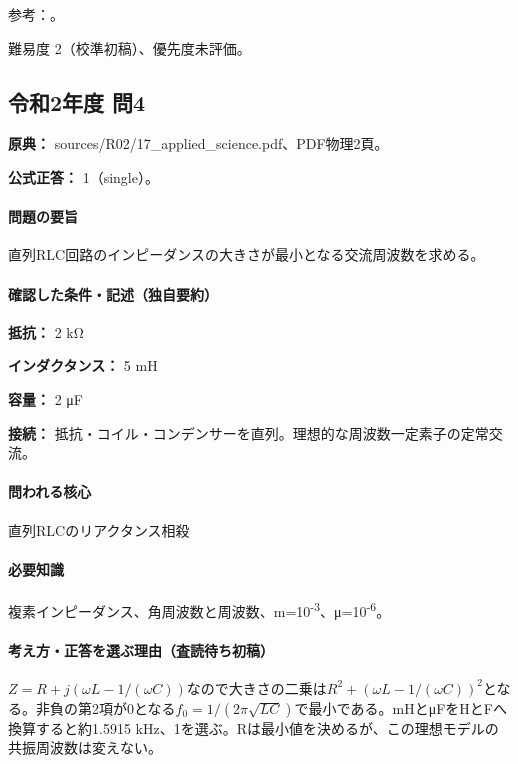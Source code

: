 \par 参考：\cite{mit_em06,mit_semiconductor}。

\par 難易度 2（校準初稿）、優先度未評価。

\subsection{令和2年度 問4}
\label{q:r02-reg-applied-04}

\noindent\textbf{原典：} sources/R02/17\_applied\_science.pdf、PDF物理2頁。

\textbf{公式正答：} 1（single）。

\paragraph{問題の要旨} 直列RLC回路のインピーダンスの大きさが最小となる交流周波数を求める。

\paragraph{確認した条件・記述（独自要約）}\mbox{}\par

\noindent\textbf{抵抗：} 2 kΩ\par

\noindent\textbf{インダクタンス：} 5 mH\par

\noindent\textbf{容量：} 2 μF\par

\noindent\textbf{接続：} 抵抗・コイル・コンデンサーを直列。理想的な周波数一定素子の定常交流。\par

\paragraph{問われる核心} 直列RLCのリアクタンス相殺

\paragraph{必要知識} 複素インピーダンス、角周波数と周波数、m=\allowbreak{}10\textsuperscript{-3}、μ=10\textsuperscript{-6}。

\paragraph{考え方・正答を選ぶ理由（査読待ち初稿）} \(Z=R+j(\omega L-1/(\omega C))\)なので大きさの二乗は\(R^2+(\omega L-1/(\omega C))^2\)となる。非負の第2項が0となる\(f_0=1/(2\pi\sqrt{LC})\)で最小である。mHとμFをHとFへ換算すると約1.5915 kHz、1を選ぶ。Rは最小値を決めるが、この理想モデルの共振周波数は変えない。

